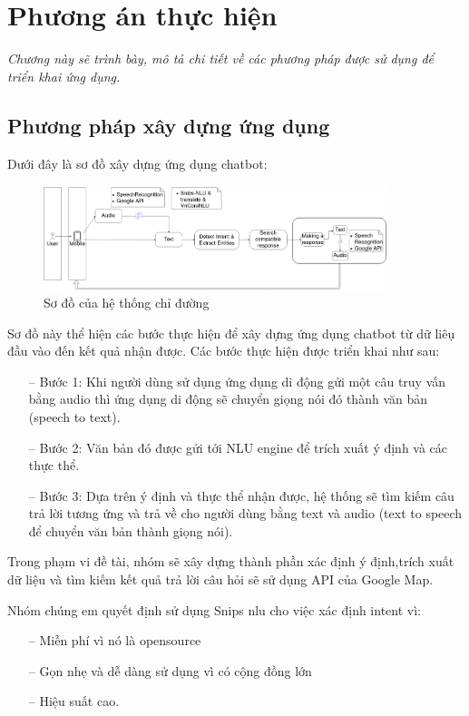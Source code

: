 \chapter{Phương án thực hiện}
\label{Chapter4}

\emph{Chương này sẽ trình bày, mô tả chi tiết về các phương pháp được sử dụng để triển khai ứng dụng.}


\section{Phương pháp xây dựng ứng dụng}
Dưới đây là sơ đồ xây dựng ứng dụng chatbot:
\begin{figure}[htp]
    \centering
    \includegraphics[width=10cm]{images/Structure-description.png}
    \caption{Sơ đồ của hệ thống chỉ đường}
    \label{fig:sodohethongchiduong}

\end{figure}

Sơ đồ này thể hiện các bước thực hiện để xây dựng ứng dụng chatbot từ dữ liêụ đầu vào đến kết quả nhận được. Các bước thực hiện được triển khai như sau:
\begin{itemize}
    \item[--] Bước 1: Khi người dùng sử dụng ứng dụng di động gửi một câu truy vấn bằng audio thì ứng dụng di động sẽ chuyển giọng nói đó thành văn bản (speech to text).
    \item[--] Bước 2: Văn bản đó được gửi tới NLU engine để trích xuất ý định và các thực thể.
    \item[--] Bước 3: Dựa trên ý định và thực thể nhận được, hệ thống sẽ tìm kiếm câu trả lời tương ứng và trả về cho người dùng bằng text và audio (text to speech để chuyển văn bản thành giọng nói).
\end{itemize}
Trong phạm vi đề tài, nhóm sẽ xây dựng thành phần xác định ý định,trích xuất dữ liệu và tìm kiếm kết quả trả lời câu hỏi sẽ sử dụng API của Google Map.

Nhóm chúng em quyết định sử dụng Snips \ac{nlu} cho việc xác định intent vì:
\begin{itemize}
    \item[--] Miễn phí vì nó là opensource
    \item[--] Gọn nhẹ và dễ dàng sử dụng vì có cộng đồng lớn
    \item[--] Hiệu suất cao.
\end{itemize}


